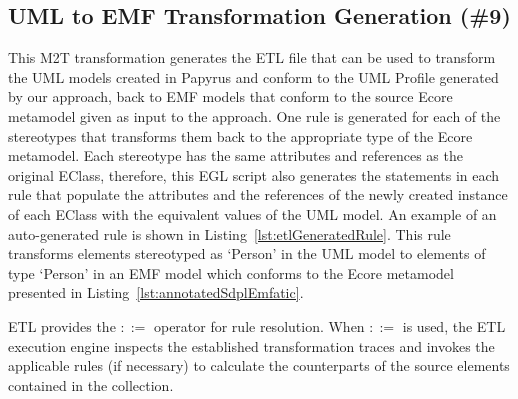 \subsection{UML to EMF Transformation Generation (\#9)}
\label{sec:uml2emf}


This M2T transformation generates the ETL file that can be used to transform the UML models created in Papyrus and conform to the UML Profile generated by our approach, back to EMF models that conform to the source Ecore metamodel given as input to the approach. 
One rule is generated for each of the stereotypes that transforms them back to the appropriate type of the Ecore metamodel. 
Each stereotype has the same attributes and references as the original EClass, therefore, this EGL script also generates the statements in each rule that populate the attributes and the references of the newly created instance of each EClass with the equivalent values of the UML model. 
An example of an auto-generated rule is shown in Listing~\ref{lst:etlGeneratedRule}. 
This rule transforms elements stereotyped as `Person' in the UML model to elements of type `Person' in an EMF model which conforms to the Ecore metamodel presented in Listing~\ref{lst:annotatedSdplEmfatic}.



ETL provides the $::=$ operator for rule resolution. 
When $::=$ is used, the ETL execution engine inspects the established transformation traces and invokes the applicable rules (if necessary) to calculate the counterparts of the source elements contained in the collection. 


